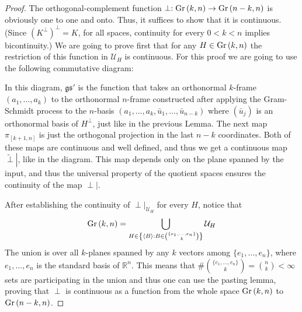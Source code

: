 \begin{proof} The orthogonal-complement function $\perp:\Gr{k}{n}\to\Gr{n-k}{n}$ is obviously one to one and onto. Thus, it suffices to show that it is continuous. (Since ${\left(K^{\perp}\right)}^{\perp}=K$, for all spaces, continuity for every $0<k<n$ implies bicontinuity.) We are going to prove first that for any $H\in\Gr{k}{n}$ the restriction of this function in $\mathcal{U}_H$ is continuous. For this proof we are going to use the following commutative diagram:
\begin{center}
\end{center}
In this diagram, $\mathfrak{gs}'$ is the function that takes an orthonormal $k$-frame $(a_1,\ldots,a_k)$ to the orthonormal $n$-frame constructed after applying the Gram-Schmidt process to the $n$-basis $\left(a_1,\ldots,a_k,\bar{u}_1,\ldots,\bar{u}_{n-k}\right)$ where $\left(\bar{u}_j\right)$ is an orthonormal basis of $H^{\perp}$, just like in the previous Lemma. The next map $\pi_{[k+1,n]}$ is just the orthogonal projection in the last $n-k$ coordinates. Both of these maps are continuous and well defined, and thus we get a continuous map $\left.\tilde{\perp}\right|$, like in the diagram. This map depends only on the plane spanned by the input, and thus the universal property of the quotient spaces ensures the continuity of the map $\left.\perp\right|$.

After establishing the continuity of $\left.\perp\right|_{\mathcal{U}_H}$ for every $H$, notice that
\[\Gr{k}{n} = \bigcup_{H\in\left\{\left<B\right>:B\in\binom{\{e_1,\ldots,e_n\}}{k}\right\}}\mathcal{U}_H\]
The union is over all $k$-planes spanned by any $k$ vectors among $\{e_1,\ldots,e_n\}$, where $e_1,\ldots,e_n$ is the standard basis of $\mathbb{R}^n$. This means that $\#\binom{\{e_1,\ldots,e_n\}}{k}=\binom{n}{k}<\infty$ sets are participating in the union and thus one can use the pasting lemma, proving that $\perp$ is continuous as a function from the whole space $\Gr{k}{n}$ to $\Gr{n-k}{n}$.
\end{proof}

